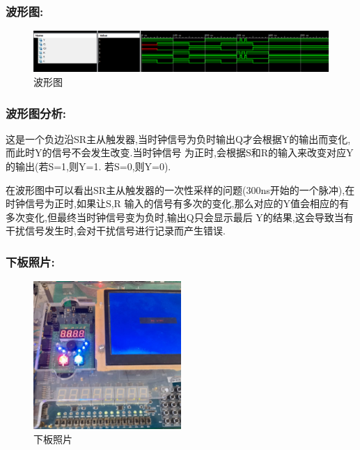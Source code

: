\documentclass{article}
\begin{document}
\subsubsection*{波形图:}
    \begin{figure}[H]
    \centering
    \includegraphics[width=1\textwidth]{lab9p/4.png}
    \caption{\label{Lab9}波形图}
    \end{figure}


\subsubsection*{波形图分析:}
这是一个负边沿SR主从触发器,当时钟信号为负时输出Q才会根据Y的输出而变化,而此时Y的信号不会发生改变.当时钟信号
为正时,会根据S和R的输入来改变对应Y的输出(若S=1,则Y=1. 若S=0,则Y=0).

在波形图中可以看出SR主从触发器的一次性采样的问题(300ns开始的一个脉冲),在时钟信号为正时,如果让S,R
输入的信号有多次的变化,那么对应的Y值会相应的有多次变化,但最终当时钟信号变为负时,输出Q只会显示最后
Y的结果,这会导致当有干扰信号发生时,会对干扰信号进行记录而产生错误.

\subsubsection*{下板照片:}
    \begin{figure}[H]
    \centering
    \includegraphics[width=0.5\textwidth]{lab9p/25.jpg}
    \caption{\label{Lab9}下板照片}
    \end{figure}
\end{document}
